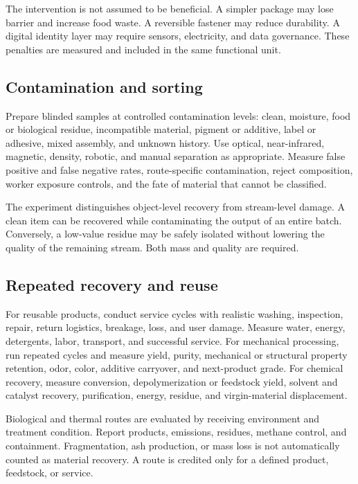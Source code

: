 \documentclass[conference]{IEEEtran}
\begin{document}
The intervention is not assumed to be beneficial. A simpler package may lose barrier and increase food waste. A reversible fastener may reduce durability. A digital identity layer may require sensors, electricity, and data governance. These penalties are measured and included in the same functional unit.

\subsection{Contamination and sorting}

Prepare blinded samples at controlled contamination levels: clean, moisture, food or biological residue, incompatible material, pigment or additive, label or adhesive, mixed assembly, and unknown history. Use optical, near-infrared, magnetic, density, robotic, and manual separation as appropriate. Measure false positive and false negative rates, route-specific contamination, reject composition, worker exposure controls, and the fate of material that cannot be classified.

The experiment distinguishes object-level recovery from stream-level damage. A clean item can be recovered while contaminating the output of an entire batch. Conversely, a low-value residue may be safely isolated without lowering the quality of the remaining stream. Both mass and quality are required.

\subsection{Repeated recovery and reuse}

For reusable products, conduct service cycles with realistic washing, inspection, repair, return logistics, breakage, loss, and user damage. Measure water, energy, detergents, labor, transport, and successful service. For mechanical processing, run repeated cycles and measure yield, purity, mechanical or structural property retention, odor, color, additive carryover, and next-product grade. For chemical recovery, measure conversion, depolymerization or feedstock yield, solvent and catalyst recovery, purification, energy, residue, and virgin-material displacement.

Biological and thermal routes are evaluated by receiving environment and treatment condition. Report products, emissions, residues, methane control, and containment. Fragmentation, ash production, or mass loss is not automatically counted as material recovery. A route is credited only for a defined product, feedstock, or service.
\end{document}

